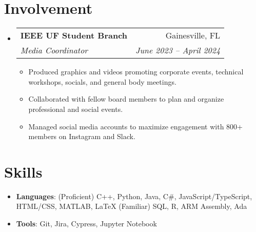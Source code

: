 \documentclass[letterpaper,11pt]{article}
\makeatletter
\newcommand{\resumeItemSkills}[2]{
  \item\normalsize{
    \textbf{#1}{: #2 \vspace{-2pt}}
  }
}
\newcommand{\resumeItemExperience}[1]{
  \item\small{
    {#1 \vspace{-2pt}}
  }
}
\newcommand{\resumeSubheading}[4]{
  \vspace{-1pt}\item
    \begin{tabular*}{0.97\textwidth}{l@{\extracolsep{\fill}}r}
      \textbf{#1} & #2 \\
      \textit{\small#3} & \textit{\small #4} \\
    \end{tabular*}\vspace{-6pt}
}
\newcommand{\resumeSubItemSkills}[2]{\resumeItemSkills{#1}{#2}\vspace{-4pt}}
\newcommand{\resumeSubHeadingListStart}{\begin{itemize}[leftmargin=*, label={}]}
\newcommand{\resumeSubHeadingListStartSkillsAwards}{\begin{itemize}[leftmargin=*]}
\newcommand{\resumeSubHeadingListEnd}{\end{itemize}}
\newcommand{\resumeItemListStart}{\begin{itemize}}
\newcommand{\resumeItemListEnd}{\end{itemize}\vspace{-5pt}}
\makeatother
\begin{document}
\section{Involvement}
    \resumeSubHeadingListStart
      \resumeSubheading
        {IEEE UF Student Branch}{Gainesville, FL}
        {Media Coordinator}{June 2023 -- April 2024}
        \resumeItemListStart
          \resumeItemExperience
            {Produced graphics and videos promoting corporate events, technical workshops, socials, and general body meetings.}
          \resumeItemExperience
            {Collaborated with fellow board members to plan and organize professional and social events.}
          \resumeItemExperience
            {Managed social media accounts to maximize engagement with 800+ members on Instagram and Slack.}
        \resumeItemListEnd
    \resumeSubHeadingListEnd
          
\section{Skills}
  \resumeSubHeadingListStartSkillsAwards
    \resumeSubItemSkills{Languages}{(Proficient) C++, Python, Java, C\#, JavaScript/TypeScript, HTML/CSS, MATLAB, LaTeX \newline
    (Familiar) SQL, R, ARM Assembly, Ada}
    \resumeSubItemSkills{Tools}{Git, Jira, Cypress, Jupyter Notebook}
  \resumeSubHeadingListEnd
\end{document}
